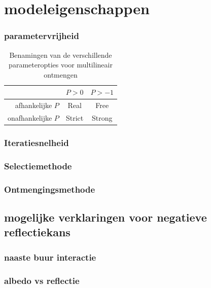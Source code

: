 \documentclass[12pt]{report}
\begin{document}


\section{modeleigenschappen}

\subsubsection{parametervrijheid}

\begin{table}
\Large\center
\begin{tabular}{r|c c}
&$P>0$&$P>-1$ \\
\hline
afhankelijke $P$ & Real & Free \\
onafhankelijke $P$ & Strict & Strong
\end{tabular}
\caption{Benamingen van de verschillende parameteropties voor multilineair ontmengen}
\end{table}

\subsubsection{Iteratiesnelheid}

\subsubsection{Selectiemethode}

\subsubsection{Ontmengingsmethode}


\subsection{mogelijke verklaringen voor negatieve reflectiekans}

\subsubsection{naaste buur interactie}

\subsubsection{albedo vs reflectie}
\end{document}
